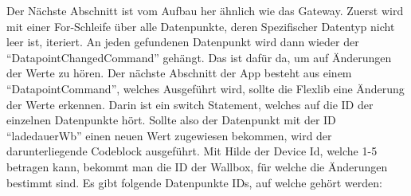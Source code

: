 Der Nächste Abschnitt ist vom Aufbau her ähnlich wie das Gateway. Zuerst wird mit einer For-Schleife über alle Datenpunkte, deren Spezifischer Datentyp nicht leer ist, iteriert. An jeden gefundenen Datenpunkt wird dann wieder der “DatapointChangedCommand” gehängt. Das ist dafür da, um auf Änderungen der Werte zu hören. Der nächste Abschnitt der App besteht aus einem “DatapointCommand”, welches Ausgeführt wird, sollte die Flexlib eine Änderung der Werte erkennen. Darin ist ein switch Statement, welches auf die ID der einzelnen Datenpunkte hört. Sollte also der Datenpunkt mit der ID “ladedauerWb” einen neuen Wert zugewiesen bekommen, wird der darunterliegende Codeblock ausgeführt. Mit Hilde der Device Id, welche 1-5 betragen kann, bekommt man die ID der Wallbox, für welche die Änderungen bestimmt sind. Es gibt folgende Datenpunkte IDs, auf welche gehört werden: 

